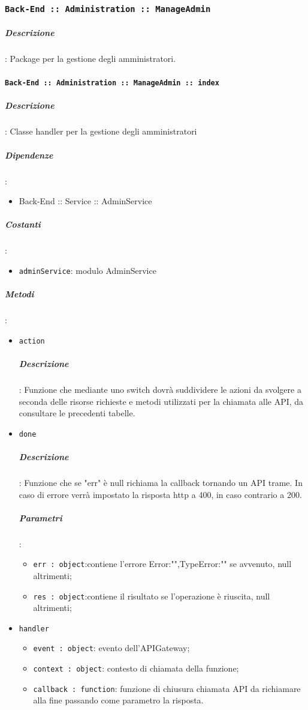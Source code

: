 \documentclass[../DefinizioneDiProdotto_v3.0.0.tex]{subfiles}
\begin{document}
\subsubsection{\texttt{Back-End :: Administration :: ManageAdmin}}
\subparagraph{Descrizione}: Package per la gestione degli amministratori.

\paragraph{\texttt{Back-End :: Administration :: ManageAdmin :: index}}
\subparagraph{Descrizione}: Classe handler per la gestione degli amministratori
\subparagraph{Dipendenze}:
\begin{itemize}
	\item	{Back-End :: Service :: AdminService}
\end{itemize}
\subparagraph{Costanti}:
\begin{itemize}
	\item \texttt{adminService}: modulo AdminService
\end{itemize}
\subparagraph{Metodi}:
\begin{itemize}
	\item \texttt{action}
	      \subparagraph{Descrizione}: Funzione che mediante uno switch dovrà suddividere le azioni da svolgere a seconda delle risorse richieste e metodi utilizzati per la chiamata alle API, da consultare le precedenti tabelle.
	\item \texttt{done}
	      \subparagraph{Descrizione}: Funzione che se "err" è null richiama la callback tornando un API trame. In caso di errore verrà impostato la risposta http a 400, in caso contrario a 200.
	      \subparagraph{Parametri}:
	      \begin{itemize}
	      	\item \texttt{err : object}:contiene l'errore {Error:"",TypeError:""} se avvenuto, null altrimenti;
	      	\item \texttt{res : object}:contiene il risultato se l'operazione è riuscita, null altrimenti;
	      \end{itemize}
	\item \texttt{handler}
	      \begin{itemize}
	      	\item \texttt{event : object}: evento dell'APIGateway;
	      	\item \texttt{context : object}: contesto di chiamata della funzione;
	      	\item \texttt{callback : function}: funzione di chiusura chiamata API da richiamare alla fine passando come parametro la risposta.
	      \end{itemize}
\end{itemize}
\end{document}
